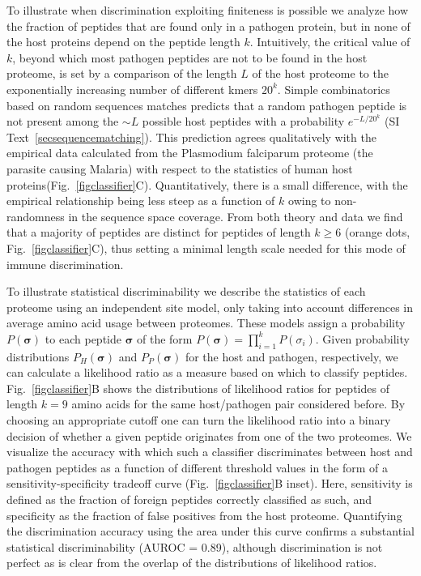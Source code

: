 \documentclass[superscriptaddress,twocolumn,pre]{revtex4}
\newcommand{\B}{\boldsymbol}
\newcommand{\<}{\langle}
\renewcommand{\>}{\rangle}
\begin{document}
To illustrate when discrimination exploiting finiteness is possible we analyze how the fraction of peptides that are found only in a pathogen protein, but in none of the host proteins depend on the peptide length $k$. Intuitively, the critical value of $k$, beyond which most pathogen peptides are not to be found in the host proteome, is set by a comparison of the length $L$ of the host proteome to the exponentially increasing number of different kmers $20^k$. Simple combinatorics based on random sequences matches predicts that a random pathogen peptide is not present among the $\sim L$ possible host peptides with a probability $e^{-L/20^k}$ (SI Text~\ref{secsequencematching}). This prediction agrees qualitatively with the empirical data calculated from the Plasmodium falciparum proteome (the parasite causing Malaria) with respect to the statistics of human host proteins(Fig.~\ref{figclassifier}C). Quantitatively, there is a small difference, with the empirical relationship being less steep as a function of $k$ owing to non-randomness in the sequence space coverage. From both theory and data we find that a majority of peptides are distinct for peptides of length $k\geq6$ (orange dots, Fig.~\ref{figclassifier}C), thus setting a minimal length scale needed for this mode of immune discrimination.  

To illustrate statistical discriminability we describe the statistics of each proteome using an independent site model, only taking into account differences in average amino acid usage between proteomes. These models assign a probability $P(\B \sigma)$ to each peptide $\B \sigma$ of the form $P(\B \sigma) = \prod_{i=1}^k P(\sigma_i)$. Given probability distributions $P_H(\B \sigma)$ and $P_P(\B \sigma)$ for the host and pathogen, respectively, we can calculate a likelihood ratio as a measure based on which to classify peptides. Fig.~\ref{figclassifier}B shows the distributions of likelihood ratios for peptides of length $k=9$ amino acids for the same host/pathogen pair considered before. By choosing an appropriate cutoff one can turn the likelihood ratio into a binary decision of whether a given peptide originates from one of the two proteomes. We visualize the accuracy with which such a classifier discriminates between host and pathogen peptides as a function of different threshold values in the form of a sensitivity-specificity tradeoff curve (Fig.~\ref{figclassifier}B inset). Here, sensitivity is defined as the fraction of foreign peptides correctly classified as such, and specificity as the fraction of false positives from the host proteome. Quantifying the discrimination accuracy using the area under this curve confirms a substantial statistical discriminability (AUROC = 0.89), although discrimination is not perfect as is clear from the overlap of the distributions of likelihood ratios.
\end{document}
